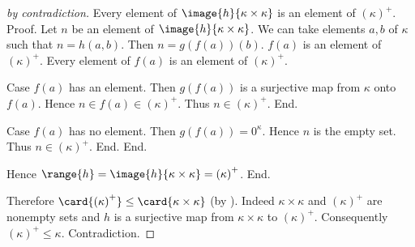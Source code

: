 \documentclass{stex}
\newcommand{\constzero}[1]{0^{#1}}
\newcommand{\cardsucc}[1]{\left(#1\right)^{+}}
\begin{document}
\begin{forthel}
\begin{proof}[by contradiction]
        Every element of $\image{h}{\kappa \times \kappa}$ is an element of
        $\cardsucc{\kappa}$. \\
        Proof.
          Let $n$ be an element of $\image{h}{\kappa \times \kappa}$.
          We can take elements $a, b$ of $\kappa$ such that $n = h(a,b)$.
          Then $n = g(f(a))(b)$.
          $f(a)$ is an element of $\cardsucc{\kappa}$.
          Every element of $f(a)$ is an element of $\cardsucc{\kappa}$.

          Case $f(a)$ has an element.
            Then $g(f(a))$ is a surjective map from $\kappa$ onto $f(a)$.
            Hence $n \in f(a) \in \cardsucc{\kappa}$.
            Thus $n \in \cardsucc{\kappa}$.
          End.

          Case $f(a)$ has no element.
            Then $g(f(a)) = \constzero{\kappa}$.
            Hence $n$ is the empty set.
            Thus $n \in \cardsucc{\kappa}$.
          End.
        End.

        Hence $\range{h} = \image{h}{\kappa \times \kappa} = \cardsucc{\kappa}$.
      End.

      Therefore $\card{\cardsucc{\kappa}} \leq \card{\kappa \times \kappa}$
      (by ).
      Indeed $\kappa \times \kappa$ and $\cardsucc{\kappa}$ are nonempty sets and $h$
      is a surjective map from $\kappa \times \kappa$ to $\cardsucc{\kappa}$.
      Consequently $\cardsucc{\kappa} \leq \kappa$.
      Contradiction.
    \end{proof}
  \end{forthel}

  \printbibliography
\end{document}
